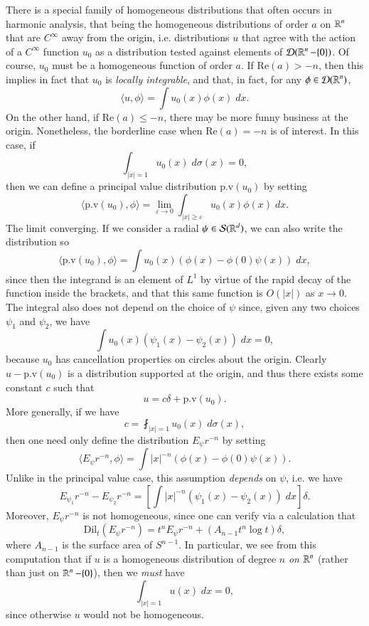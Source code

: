 There is a special family of homogeneous distributions that often occurs in harmonic analysis, that being the homogeneous distributions of order $a$ on $\operatorname{\mathbb{R}}^n$ that are $C^\infty$ away from the origin, i.e. distributions $u$ that agree with the action of a $C^\infty$ function $u_0$ as a distribution tested against elements of $\operatorname{\mathcal{D}}(\operatorname{\mathbb{R}}^n - \{ 0 \})$. Of course, $u_0$ must be a homogeneous function of order $a$. If $\text{Re}(a) > -n$, then this implies in fact that $u_0$ is \emph{locally integrable}, and that, in fact, for any $\phi \in \operatorname{\mathcal{D}}(\operatorname{\mathbb{R}}^n)$,
%
\[ \langle u, \phi \rangle = \int u_0(x) \phi(x)\; dx. \]
%
On the other hand, if $\text{Re}(a) \leq -n$, there may be more funny business at the origin. Nonetheless, the borderline case when $\text{Re}(a) = -n$ is of interest. In this case, if
%
\[ \int_{|x| = 1} u_0(x)\; d\sigma(x) = 0, \]
%
then we can define a principal value distribution $\text{p.v}(u_0)$ by setting
%
\[ \langle \text{p.v}(u_0), \phi \rangle = \lim_{\varepsilon \to 0} \int_{|x| \geq \varepsilon} u_0(x) \phi(x)\; dx. \]
%
The limit converging. If we consider a radial $\psi \in \operatorname{\mathcal{S}}(\operatorname{\mathbb{R}}^d)$, we can also write the distribution so
%
\[ \langle \text{p.v}(u_0), \phi \rangle = \int u_0(x) \left( \phi(x) - \phi(0)\psi(x) \right)\; dx, \]
%
since then the integrand is an element of $L^1$ by virtue of the rapid decay of the function inside the brackets, and that this same function is $O(|x|)$ as $x \to 0$. The integral also does not depend on the choice of $\psi$ since, given any two choices $\psi_1$ and $\psi_2$, we have
%
\[ \int u_0(x) ( \psi_1(x) - \psi_2(x) )\; dx = 0, \]
%
because $u_0$ has cancellation properties on circles about the origin. Clearly $u - \text{p.v}(u_0)$ is a distribution supported at the origin, and thus there exists some constant $c$ such that
%
\[ u = c \delta + \text{p.v}(u_0). \]
%
More generally, if we have
%
\[ c = \fint_{|x| = 1} u_0(x)\; d\sigma(x), \]
%
then one need only define the distribution $E_\psi r^{-n}$ by setting
%
\[ \langle E_\psi r^{-n}, \phi \rangle = \int |x|^{-n} \left( \phi(x) - \phi(0) \psi(x) \right). \]
%
Unlike in the principal value case, this assumption \emph{depends} on $\psi$, i.e. we have
%
\[ E_{\psi_1} r^{-n} - E_{\psi_2} r^{-n} = \left[ \int |x|^{-n} ( \psi_1(x) - \psi_2(x) )\; dx \right] \delta. \]
%
Moreover, $E_\psi r^{-n}$ is not homogeneous, since one can verify via a calculation that
%
\[ \text{Dil}_t ( E_\psi r^{-n} ) = t^n E_\psi r^{-n} + \left( A_{n-1} t^n \log t \right) \delta, \]
%
where $A_{n-1}$ is the surface area of $S^{n-1}$. In particular, we see from this computation that if $u$ is a homogeneous distribution of degree $n$ \emph{on $\operatorname{\mathbb{R}}^n$} (rather than just on $\operatorname{\mathbb{R}}^n - \{ 0 \}$), then we \emph{must} have
%
\[ \int_{|x| = 1} u(x)\; dx = 0, \]
%
since otherwise $u$ would not be homogeneous.

